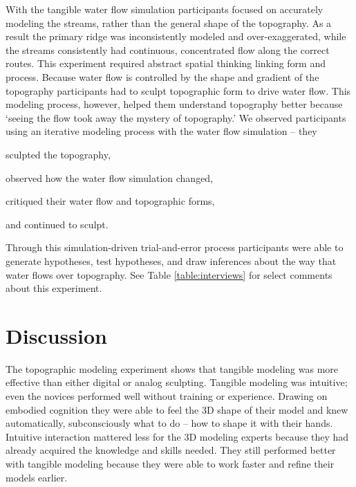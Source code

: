 \documentclass[Afour,sagev,times]{sagej} %
\begin{document}
With the tangible water flow simulation
participants focused on accurately modeling the streams, 
rather than the general shape of the topography. 
As a result the primary ridge was 
inconsistently modeled and over-exaggerated,
while the streams consistently 
had continuous, concentrated flow 
along the correct routes.
This experiment required abstract spatial thinking linking form and process. 
Because water flow is controlled by the shape and gradient of the topography
participants had to sculpt topographic form to drive water flow. 
This modeling process, however, helped them understand topography better 
because `seeing the flow took away the mystery of topography.'
%
We observed participants using an iterative modeling process 
with the water flow simulation -- 
they 
\begin{enumerate*}[label=\alph*),font=\itshape]
\item sculpted the topography, 
\item observed how the water flow simulation changed, 
\item critiqued their water flow and topographic forms, 
\item and continued to sculpt.
\end{enumerate*}
%
Through this simulation-driven trial-and-error process 
participants were able 
to generate hypotheses, test hypotheses, and draw inferences 
about the way that water flows over topography. 
See Table \ref{table:interviews} for select comments about this experiment.





\section{Discussion}
The topographic modeling experiment
shows that tangible modeling was 
more effective than either digital or analog sculpting. 
Tangible modeling was intuitive;
even the novices performed well without training or experience.
Drawing on embodied cognition
they were able to feel the 3D shape of their model
and knew automatically, subconsciously what to do --
how to shape it with their hands.
Intuitive interaction mattered less for the 3D modeling experts
because they had already acquired the knowledge and skills needed.
They still performed better with tangible modeling
because they were able to 
work faster and refine their models earlier. 
\end{document}
